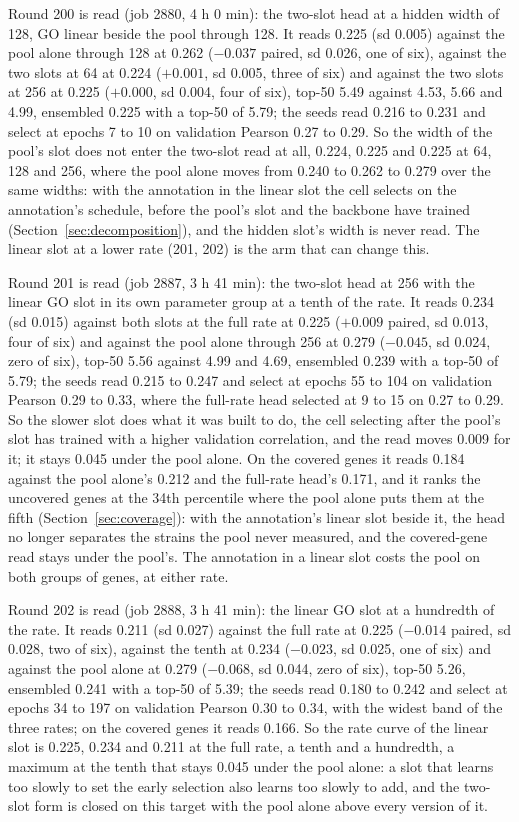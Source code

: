 Round 200 is read (job 2880, 4 h 0 min): the two-slot head at a hidden width of 128,
GO linear beside the pool through 128. It reads 0.225 (sd 0.005) against the pool
alone through 128 at 0.262 ($-0.037$ paired, sd 0.026, one of six), against the two
slots at 64 at 0.224 ($+0.001$, sd 0.005, three of six) and against the two slots at
256 at 0.225 ($+0.000$, sd 0.004, four of six), top-50 5.49 against 4.53, 5.66 and
4.99, ensembled 0.225 with a top-50 of 5.79; the seeds read 0.216 to 0.231 and select
at epochs 7 to 10 on validation Pearson 0.27 to 0.29. So the width of the pool's slot
does not enter the two-slot read at all, 0.224, 0.225 and 0.225 at 64, 128 and 256,
where the pool alone moves from 0.240 to 0.262 to 0.279 over the same widths: with the
annotation in the linear slot the cell selects on the annotation's schedule, before
the pool's slot and the backbone have trained (Section~\ref{sec:decomposition}), and
the hidden slot's width is never read. The linear slot at a lower rate (201, 202) is
the arm that can change this.

Round 201 is read (job 2887, 3 h 41 min): the two-slot head at 256 with the linear GO
slot in its own parameter group at a tenth of the rate. It reads 0.234 (sd 0.015)
against both slots at the full rate at 0.225 ($+0.009$ paired, sd 0.013, four of six)
and against the pool alone through 256 at 0.279 ($-0.045$, sd 0.024, zero of six),
top-50 5.56 against 4.99 and 4.69, ensembled 0.239 with a top-50 of 5.79; the seeds
read 0.215 to 0.247 and select at epochs 55 to 104 on validation Pearson 0.29 to 0.33,
where the full-rate head selected at 9 to 15 on 0.27 to 0.29. So the slower slot does
what it was built to do, the cell selecting after the pool's slot has trained with a
higher validation correlation, and the read moves 0.009 for it; it stays 0.045 under
the pool alone. On the covered genes it reads 0.184 against the pool alone's 0.212 and
the full-rate head's 0.171, and it ranks the uncovered genes at the 34th percentile
where the pool alone puts them at the fifth (Section~\ref{sec:coverage}): with the
annotation's linear slot beside it, the head no longer separates the strains the pool
never measured, and the covered-gene read stays under the pool's. The annotation in a
linear slot costs the pool on both groups of genes, at either rate.

Round 202 is read (job 2888, 3 h 41 min): the linear GO slot at a hundredth of the
rate. It reads 0.211 (sd 0.027) against the full rate at 0.225 ($-0.014$ paired, sd
0.028, two of six), against the tenth at 0.234 ($-0.023$, sd 0.025, one of six) and
against the pool alone at 0.279 ($-0.068$, sd 0.044, zero of six), top-50 5.26,
ensembled 0.241 with a top-50 of 5.39; the seeds read 0.180 to 0.242 and select at
epochs 34 to 197 on validation Pearson 0.30 to 0.34, with the widest band of the three
rates; on the covered genes it reads 0.166. So the rate curve of the linear slot is
0.225, 0.234 and 0.211 at the full rate, a tenth and a hundredth, a maximum at the
tenth that stays 0.045 under the pool alone: a slot that learns too slowly to set the
early selection also learns too slowly to add, and the two-slot form is closed on this
target with the pool alone above every version of it.

